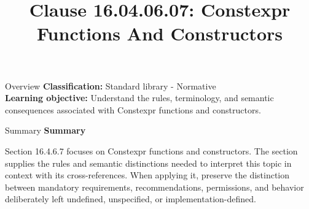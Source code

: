 \documentclass[10pt,letterpaper]{article}
\title{Clause 16.04.06.07: Constexpr Functions And Constructors}
\author{}
\date{}
\begin{document}
\maketitle
\begin{CornellOverviewBox}{Overview}
\textbf{Classification:} Standard library - Normative\\[2pt]
\textbf{Learning objective:} Understand the rules, terminology, and semantic consequences associated with Constexpr functions and constructors.
\end{CornellOverviewBox}\begin{CornellSummaryBox}{Summary}
{\sffamily\bfseries\color{Accent} Summary}\par\vspace{3pt}Section 16.4.6.7 focuses on Constexpr functions and constructors. The section supplies the rules and semantic distinctions needed to interpret this topic in context with its cross-references. When applying it, preserve the distinction between mandatory requirements, recommendations, permissions, and behavior deliberately left undefined, unspecified, or implementation-defined.
\end{CornellSummaryBox}
\end{document}
